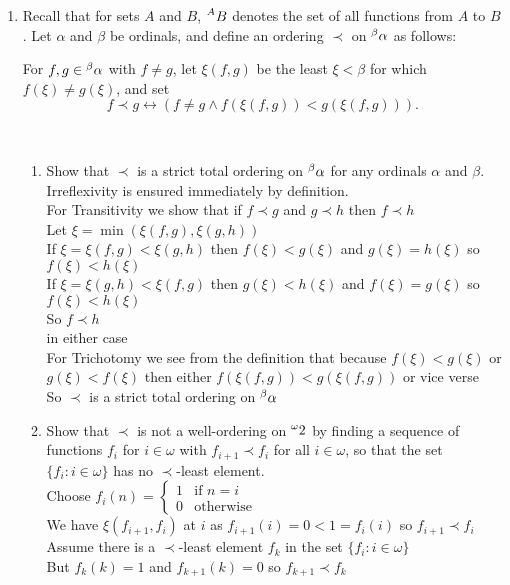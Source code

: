 \documentclass[11pt]{amsart}
\newcommand{\leftsuperscript}[2]{{\vphantom{{#1}}}^{#2}{#1}}
\begin{document}
\begin{enumerate}
\newpage 

\item Recall that for sets $A$ and $B$, $\leftsuperscript{B}{A}$ denotes the set of all functions from $A$ to $B$. Let $\alpha$ and $\beta$ be ordinals, and define an ordering $\prec$ on $\leftsuperscript{\alpha}{\beta}$ as follows:

For $f, g \in \leftsuperscript{\alpha}{\beta}$ with $f \neq g$, let $\xi(f,g)$ be the least $\xi < \beta$ for which $f(\xi) \neq g(\xi)$, and set
\[ f \prec g \leftrightarrow (f \neq g \wedge f(\xi(f,g)) < g(\xi(f,g))) .\]

\ 
\begin{enumerate}
\item Show that $\prec$ is a strict total ordering on $\leftsuperscript{\alpha}{\beta}$ for any ordinals $\alpha$ and $\beta$.
\\
Irreflexivity is ensured immediately by definition.\\
For Transitivity we show that if $f \prec g$ and $g \prec h$ then $f \prec h$\\
Let $\xi = \min(\xi(f,g),\xi(g,h))$\\
If $\xi = \xi(f,g) < \xi(g,h)$ then $f(\xi) < g(\xi)$ and $g(\xi) = h(\xi)$ so $f(\xi) < h(\xi)$\\
If $\xi = \xi(g,h) < \xi(f,g)$ then $g(\xi) < h(\xi)$ and $f(\xi) = g(\xi)$ so $f(\xi) < h(\xi)$\\
So $f \prec h$\\ in either case\\
For Trichotomy we see from the definition that because $f(\xi) < g(\xi)$ or $g(\xi) < f(\xi)$ then either $f(\xi(f,g)) < g(\xi(f,g))$ or vice verse \\
So $\prec$ is a strict total ordering on $\leftsuperscript{\alpha}{\beta}$\\

\vfill
\item Show that $\prec$ is not a well-ordering on $\leftsuperscript{2}{\omega}$ by finding a sequence of functions $f_i$ for $i \in \omega$ with $f_{i+1} \prec f_i$ for all $i \in \omega$, so that the set $\{f_i : i \in \omega\}$ has no $\prec$-least element.
\\
 Choose $f_i(n) = \begin{cases} 1 & \text{if } n = i \\ 0 & \text{otherwise} \end{cases}$\\
 We have $\xi(f_{i+1},f_i)$ at $i$ as $f_{i+1}(i) = 0 < 1 = f_i(i)$ so $f_{i+1} \prec f_i$\\
 Assume there is a $\prec$-least element $f_k$ in the set $\{f_i : i \in \omega\}$\\
 But $f_k(k) = 1$ and $f_{k+1}(k) = 0$ so $f_{k+1} \prec f_k$\\

\vfill
\end{enumerate}

\end{enumerate}
\end{document}
